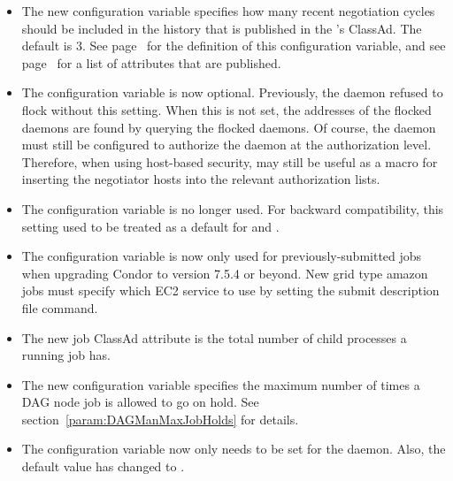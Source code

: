 \begin{itemize}
\item The new configuration variable
   specifies how many
  recent negotiation cycles should be included in the history that is
  published in the 's ClassAd.  The default is 3.  See
  page~\pageref{param:NegotiationCycleStatsLength} for the
  definition of this configuration variable, and see
  page~\pageref{attr:LastNegotiationCycleActiveSubmitterCount<X>} for a
  list of attributes that are published.

\item The configuration variable  is now
optional.  Previously, the  daemon refused to flock without
this setting.  When this is not set, the addresses of the flocked
 daemons are found by querying the flocked 
 daemons.
Of course, the  daemon must still be configured to
authorize the  daemon at the 
authorization level.  Therefore, when using host-based security,
 may still be useful as a macro for inserting
the negotiator hosts into the relevant authorization lists.

\item The configuration variable  is no longer used.
For backward compatibility, this setting used to be treated as a default
for  and .

\item The configuration variable  is now only used
for previously-submitted jobs when upgrading Condor to version 7.5.4 or
beyond. New grid type amazon jobs must specify which EC2 service to use
by setting the  submit description file command.

\item The new job ClassAd attribute  is the total number of 
 child processes a running job has.

\item The new configuration variable 
specifies the maximum number of times a DAG node job is allowed to go
on hold.  See section~\ref{param:DAGManMaxJobHolds} for details.

\item The configuration variable  now only
needs to be set for the  daemon. Also, the default value has
changed to .


\end{itemize}
